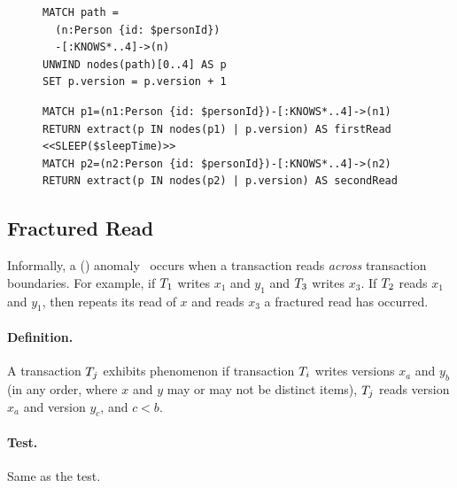
\begin{figure}[htb]
\centering
\begin{minipage}{0.33\linewidth}
\begin{lstlisting}[language=cypher,label=fig:otvfr1,caption=\tx{OTV/FR $T_\mathrm{W}$}.]
MATCH path =
  (n:Person {id: $personId})
  -[:KNOWS*..4]->(n)
UNWIND nodes(path)[0..4] AS p
SET p.version = p.version + 1
\end{lstlisting}
\end{minipage}
\quad
\begin{minipage}{0.60\linewidth}
\begin{lstlisting}[language=cypher,label=fig:otvfr2,caption=\tx{OTV/FR $T_\mathrm{R}$}.]
MATCH p1=(n1:Person {id: $personId})-[:KNOWS*..4]->(n1)
RETURN extract(p IN nodes(p1) | p.version) AS firstRead
<<SLEEP($sleepTime)>>
MATCH p2=(n2:Person {id: $personId})-[:KNOWS*..4]->(n2)
RETURN extract(p IN nodes(p2) | p.version) AS secondRead
\end{lstlisting}
\end{minipage}
\end{figure}


\subsection{Fractured Read}
\label{sec:fractured-reads}

Informally, a  () anomaly~\cite{DBLP:journals/tods/BailisFGHS16} occurs when a transaction reads \emph{across} transaction boundaries.
For example, if $T_1$ writes $x_1$ and $y_1$ and $T_3$ writes $x_3$.
If $T_2$ reads $x_1$ and $y_1$, then repeats its read of $x$ and reads $x_3$ a fractured read has occurred.

\paragraph{Definition.}
A transaction $T_j$ exhibits phenomenon  if transaction $T_i$ writes versions $x_a$ and $y_b$ (in any order, where $x$ and $y$ may or may not be distinct items), $T_j$ reads version $x_a$ and version $y_c$, and $c < b$.

\paragraph{Test.}
Same as the  test.


